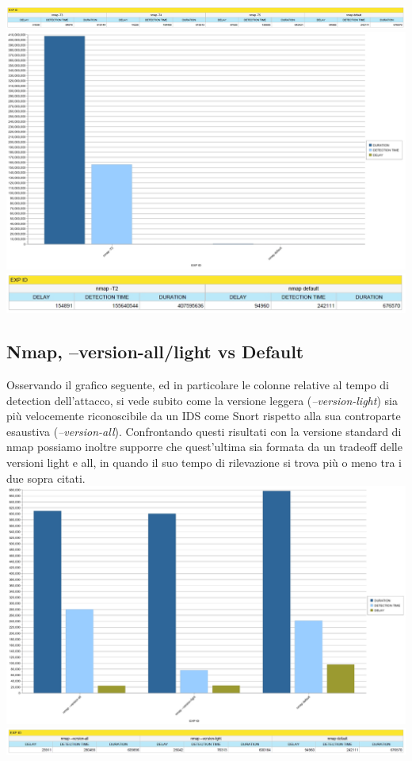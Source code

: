 \includegraphics[scale=0.3]{figure/tabella_nmap_T.jpg}\\

\includegraphics[scale=0.3]{figure/tempi_nmap_T2.jpg}\\
\includegraphics[scale=0.4]{figure/tabella_nmap_T2.jpg}

\subsection{Nmap, --version-all/light vs Default}
Osservando il grafico seguente, ed in particolare le colonne relative al tempo di detection dell'attacco, si vede subito come la versione leggera (\textit{--version-light}) sia più velocemente riconoscibile da un IDS come Snort rispetto alla sua controparte esaustiva (\textit{--version-all}). Confrontando questi risultati con la versione standard di nmap possiamo inoltre supporre che quest'ultima sia formata da un tradeoff delle versioni light e all, in quando il suo tempo di rilevazione si trova più o meno tra i due sopra citati.\\

\includegraphics[scale=0.3]{figure/tempi_nmap_all-light.jpg}\\

\includegraphics[scale=0.3]{figure/tabella_nmap_all-light.jpg}
